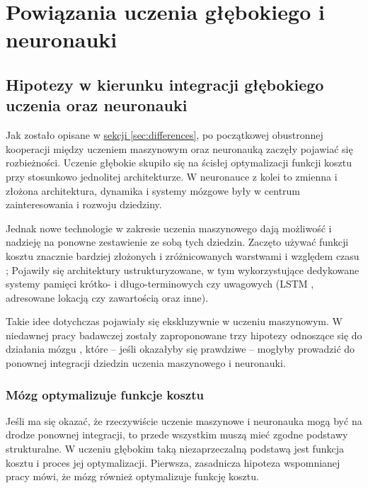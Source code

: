 \chapter{Powiązania uczenia głębokiego i neuronauki}

\section{Hipotezy w kierunku integracji głębokiego uczenia oraz neuronauki}

Jak zostało opisane w \hyperref[sec:differences]{sekcji \ref*{sec:differences}}, po początkowej obustronnej kooperacji między uczeniem maszynowym oraz neuronauką zaczęły pojawiać się rozbieżności.
Uczenie głębokie skupiło się na ścisłej optymalizacji funkcji kosztu przy stosunkowo jednolitej architekturze.
W neuronauce z kolei to zmienna i złożona architektura, dynamika i systemy mózgowe były w centrum zainteresowania i rozwoju dziedziny.

Jednak nowe technologie w zakresie uczenia maszynowego dają możliwość i nadzieję na ponowne zestawienie ze sobą tych dziedzin.
Zaczęto używać funkcji kosztu znacznie bardziej złożonych i zróżnicowanych warstwami i względem czasu \cite{gulccehre2016knowledge, saxe2013exact};
Pojawiły się architektury ustrukturyzowane, w tym wykorzystujące dedykowane systemy pamięci krótko- i długo-terminowych czy uwagowych (LSTM \cite{chung2014empirical}, adresowane lokacją czy zawartością \cite{graves2014neural} oraz inne).

Takie idee dotychczas pojawiały się ekskluzywnie w uczeniu maszynowym.
W niedawnej pracy badawczej zostały zaproponowane trzy hipotezy odnoszące się do działania mózgu \cite{marblestone2016toward}, które -- jeśli okazałyby się prawdziwe -- mogłyby prowadzić do ponownej integracji dziedzin uczenia maszynowego i neuronauki.

\subsection{Mózg optymalizuje funkcje kosztu}
\label{subsec:brain-optimizes-cost-function}

Jeśli ma się okazać, że rzeczywiście uczenie maszynowe i neuronauka mogą być na drodze ponownej integracji, to przede wszystkim muszą mieć zgodne podstawy strukturalne.
W uczeniu głębokim taką niezaprzeczalną podstawą jest funkcja kosztu i proces jej optymalizacji.
Pierwsza, zasadnicza hipoteza wspomnianej pracy \cite{marblestone2016toward} mówi, że mózg również optymalizuje funkcję kosztu.


